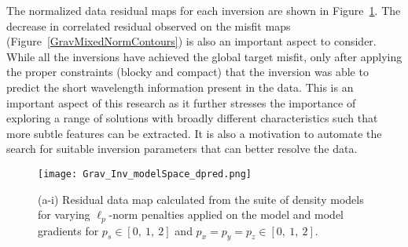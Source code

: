 The normalized data residual maps for each inversion are shown in Figure~\ref{GravMixedNorms_dpred}.
The decrease in correlated residual observed on the misfit maps (Figure~\ref{GravMixedNormContours}) is also an important aspect to consider. While all the inversions have achieved the global target misfit, only after applying the proper constraints (blocky and compact) that the inversion was able to predict the short wavelength information present in the data. This is an important aspect of this research as it further stresses the importance of exploring a range of solutions with broadly different characteristics such that more subtle features can be extracted. It is also a motivation to automate the search for suitable inversion parameters that can better resolve the data.
\begin{figure}
\texttt{[image: Grav\_Inv\_modelSpace\_dpred.png]}
\caption{(a-i) Residual data map calculated from the suite of density models for varying $\ell_p$-norm penalties applied on the model and model gradients for $p_s\in[0,\:1,\: 2]$ and $p_{x}=p_{y}=p_{z}\in[0,\:1,\: 2]$.
}
\label{GravMixedNorms_dpred}
\end{figure}



\endinput



